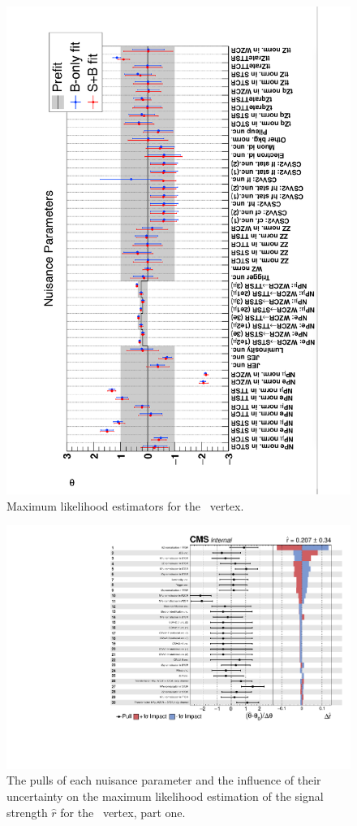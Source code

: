 \begin{figure}[htbp]
	\centering
	\includegraphics[width=1.\linewidth]{6_Search/Figures/impact/171102ZutMLE.pdf}
	\caption{Maximum likelihood estimators for the \Zut\ vertex.}
	\label{fig:171102zutmle}
\end{figure}
\newpage
\begin{figure}[htbp] 
	\centering
	  \includegraphics[page=1,width=.99\linewidth,keepaspectratio]{6_Search/Figures/impact/171102Zut.pdf}
	\caption{The pulls of each nuisance parameter and the influence of their uncertainty on the maximum likelihood estimation of the signal strength $\hat{r}$ for the \Zut\ vertex, part one.}
	\label{fig:impactsZut1}
\end{figure}

